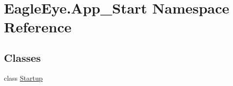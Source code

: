 \hypertarget{namespace_eagle_eye_1_1_app___start}{}\section{Eagle\+Eye.\+App\+\_\+\+Start Namespace Reference}
\label{namespace_eagle_eye_1_1_app___start}
\subsection*{Classes}
\begin{DoxyCompactItemize}
\item 
class \mbox{\hyperlink{class_eagle_eye_1_1_app___start_1_1_startup}{Startup}}
\end{DoxyCompactItemize}
